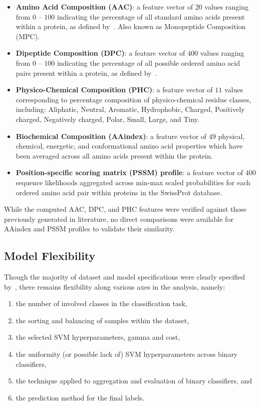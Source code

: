 \begin{itemize}
\item \textbf{Amino Acid Composition (AAC)}: a feature vector of $20$ values ranging from $0$ -- $100$ indicating the
percentage of all standard amino acids present within a protein, as defined by~\cite{gromiha2010protein}. Also known
as Monopeptide Composition (MPC).
\item \textbf{Dipeptide Composition (DPC)}: a feature vector of $400$ values ranging from $0$ -- $100$ indicating the
percentage of all possible ordered amino acid pairs present within a protein, as defined by~\cite{gromiha2010protein}.
\item \textbf{Physico-Chemical Composition (PHC)}: a feature vector of $11$ values corresponding
to percentage composition of physico-chemical residue classes, including: Aliphatic, Neutral, Aromatic, Hydrophobic, Charged, Positively charged,
Negatively charged, Polar, Small, Large, and Tiny. 
\item \textbf{Biochemical Composition (AAindex)}: a feature vector of $49$ physical, chemical, energetic, and
conformational amino acid properties which have been averaged across all amino acids present within the protein.
\item \textbf{Position-specific scoring matrix (PSSM) profile}: a feature vector of $400$ sequence
likelihoods aggregated across min-max scaled probabilities for each ordered amino acid pair within
proteins in the SwissProt database.
\end{itemize}

While the computed AAC, DPC, and PHC features were verified against those previously generated in literature, no
direct comparisons were available for AAindex and PSSM profiles to validate their similarity.
\subsection{Model Flexibility}
\label{sec:modelflex}
Though the majority of dataset and model specifications were clearly specified by~\cite{mishra2014prediction}, there
remains flexibility along various axes in the analysis, namely:

\begin{enumerate}
\item the number of involved classes in the classification task,
\item the sorting and balancing of samples within the dataset,
\item the selected SVM hyperparameters, gamma and cost,
\item the uniformity (or possible lack of) SVM hyperparameters across binary classifiers,
\item the technique applied to aggregation and evaluation of binary classifiers, and
\item the prediction method for the final labels.
\end{enumerate}

